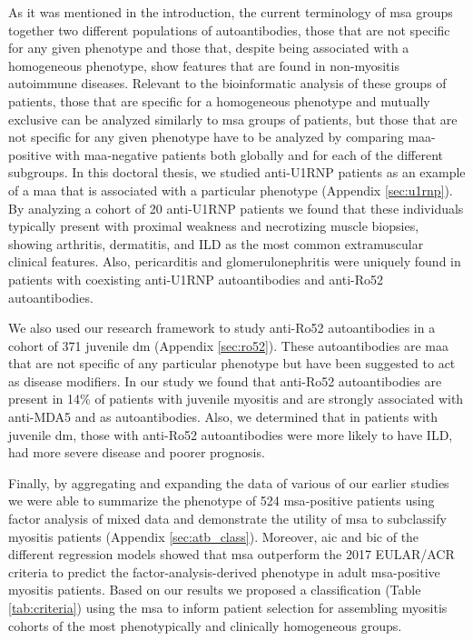 As it was mentioned in the introduction, the current terminology of \gls{msa} groups together two different populations of autoantibodies, those that are not specific for any given phenotype and those that, despite being associated with a homogeneous phenotype, show features that are found in non-myositis autoimmune diseases. Relevant to the bioinformatic analysis of these groups of patients, those that are specific for a homogeneous phenotype and mutually exclusive can be analyzed similarly to \gls{msa} groups of patients, but those that are not specific for any given phenotype have to be analyzed by comparing \gls{maa}-positive with \gls{maa}-negative patients both globally and for each of the different subgroups. In this doctoral thesis, we studied anti-U1RNP patients as an example of a \gls{maa} that is associated with a particular phenotype (Appendix \autoref{sec:u1rnp}). By analyzing a cohort of 20 anti-U1RNP patients we found that these individuals typically present with proximal weakness and necrotizing muscle biopsies, showing arthritis, dermatitis, and ILD as the most common extramuscular clinical features. Also, pericarditis and glomerulonephritis were uniquely found in patients with coexisting anti-U1RNP autoantibodies and anti-Ro52 autoantibodies.

We also used our research framework to study anti-Ro52 autoantibodies in a cohort of 371 juvenile \gls{dm} (Appendix \autoref{sec:ro52}). These autoantibodies are \gls{maa} that are not specific of any particular phenotype but have been suggested to act as disease modifiers. In our study we found that anti-Ro52 autoantibodies are present in 14\% of patients with juvenile myositis and are strongly associated with anti-MDA5 and \gls{as} autoantibodies. Also, we determined that in patients with juvenile \gls{dm}, those with anti-Ro52 autoantibodies were more likely to have ILD, had more severe disease and poorer prognosis.

Finally, by aggregating and expanding the data of various of our earlier studies we were able to summarize the phenotype of 524 \gls{msa}-positive patients using factor analysis of mixed data and demonstrate the utility of \gls{msa} to subclassify myositis patients (Appendix \autoref{sec:atb_class}). Moreover, \gls{aic} and \gls{bic} of the different regression models showed that \gls{msa} outperform the 2017 EULAR/ACR criteria to predict the factor-analysis-derived phenotype in adult \gls{msa}-positive myositis patients. Based on our results we proposed a classification (Table \ref{tab:criteria}) using the \gls{msa} to inform patient selection for assembling myositis cohorts of the most phenotypically and clinically homogeneous groups.

